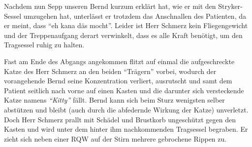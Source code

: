 {Nachdem nun Sepp unseren Bernd kurzum erklärt hat, wie er
mit den Stryker{\texttrademark}-Sessel umzugehen hat,
unterlässt er trotzdem das Anschnallen des Patienten, da er
meint, dass \enquote{eh kana däs mocht}. Leider ist Herr
Schmerz kein Fliegengewicht und der Treppenaufgang 
derart verwinkelt, dass es alle Kraft benötigt, um den
Tragsessel ruhig zu halten.

Fast am Ende des Abgangs angekommen flitzt auf einmal die
aufgeschreckte Katze des Herr Schmerz an den beiden
\enquote{Trägern} vorbei, wodurch der vorangehende Bernd
seine Konzentration verliert, ausrutscht und samt dem
Patient seitlich nach vorne auf einen Kasten und die
darunter sich versteckende Katze namens
\emph{\enquote{Kitty}} %
fällt. Bernd kann sich beim Sturz wenigsten selber abstützen
und bleibt (auch durch die abfedernde Wirkung der Katze)
unverletzt. Doch Herr Schmerz prallt mit Schädel und
Brustkorb ungeschützt gegen den Kasten und wird unter dem
hinter ihm nachkommenden Tragsessel begraben. Er zieht sich
neben einer RQW auf
der Stirn mehrere gebrochene Rippen zu.
}

\clearpage 
{}
{}{}{}{}



